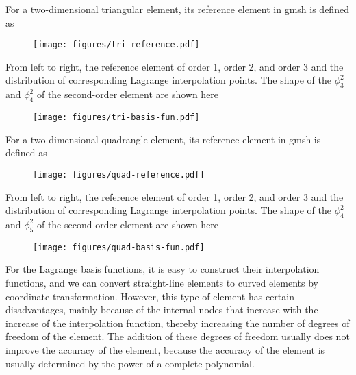 \documentclass{develop-note}
\begin{document}
For a two-dimensional triangular element, its reference element in gmsh is defined as

\begin{figure}[H]
  \centering
  \texttt{[image: figures/tri-reference.pdf]}
\end{figure}

From left to right, the reference element of order 1, order 2, and order 3 and the distribution of corresponding Lagrange interpolation points. The shape of the $\phi_{3}^{2}$ and $\phi_{4}^{2}$ of the second-order element are shown here

\begin{figure}[H]
  \centering
  \texttt{[image: figures/tri-basis-fun.pdf]}
\end{figure}

For a two-dimensional quadrangle element, its reference element in gmsh is defined as

\begin{figure}[H]
  \centering
  \texttt{[image: figures/quad-reference.pdf]}
\end{figure}

From left to right, the reference element of order 1, order 2, and order 3 and the distribution of corresponding Lagrange interpolation points. The shape of the $\phi_{4}^{2}$ and $\phi_{5}^{2}$ of the second-order element are shown here

\begin{figure}[H]
  \centering
  \texttt{[image: figures/quad-basis-fun.pdf]}
\end{figure}

For the Lagrange basis functions, it is easy to construct their interpolation functions, and we can convert straight-line elements to curved elements by coordinate transformation. However, this type of element has certain disadvantages, mainly because of the internal nodes that increase with the increase of the interpolation function, thereby increasing the number of degrees of freedom of the element. The addition of these degrees of freedom usually does not improve the accuracy of the element, because the accuracy of the element is usually determined by the power of a complete polynomial.
\end{document}
